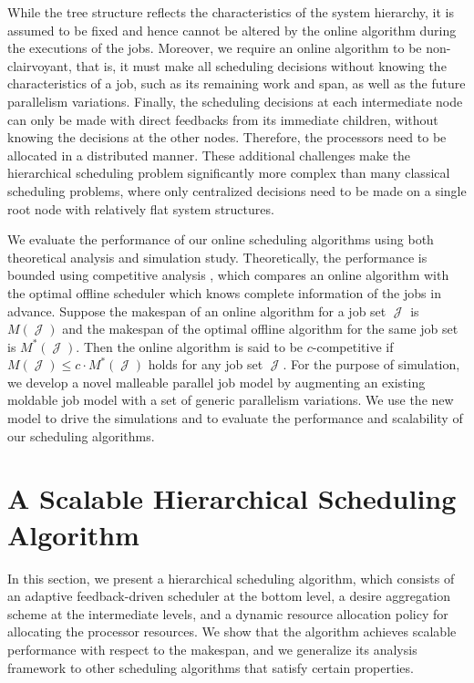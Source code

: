 \documentclass[10pt, a4paper]{article}
\newcommand{\calset}[1]{\ensuremath{\mathop{\mathcal{#1}}\nolimits}}
\newcommand{\jobset}{\calset{J}}
\begin{document}
While the tree structure reflects the characteristics of the system hierarchy, it is assumed to be
fixed and hence cannot be altered by the online algorithm during the executions of the jobs.
Moreover, we require an online algorithm to be non-clairvoyant, that is, it must make all
scheduling decisions without knowing the characteristics of a job, such as its remaining work and
span, as well as the future parallelism variations. Finally, the scheduling decisions at each
intermediate node can only be made with direct feedbacks from its immediate children, without
knowing the decisions at the other nodes. Therefore, the processors need to be allocated in a
distributed manner. These additional challenges make the hierarchical scheduling problem
significantly more complex than many classical scheduling problems, where only centralized
decisions need to be made on a single root node with relatively flat system structures.

We evaluate the performance of our online scheduling algorithms using both theoretical analysis and
simulation study. Theoretically, the performance is bounded using competitive analysis
\cite{BorodinEl98}, which compares an online algorithm with the optimal offline scheduler which
knows complete information of the jobs in advance. Suppose the makespan of an online algorithm for
a job set $\jobset$ is $M(\jobset)$ and the makespan of the optimal offline algorithm for the same
job set is $M^*(\jobset)$. Then the online algorithm is said to be $c$-competitive if $M(\jobset)
\le c \cdot M^*(\jobset)$ holds for any job set $\jobset$. For the purpose of simulation, we
develop a novel malleable parallel job model by augmenting an existing moldable job model
\cite{Downey98} with a set of generic parallelism variations. We use the new model to drive the
simulations and to evaluate the performance and scalability of our scheduling algorithms.

\section{A Scalable Hierarchical Scheduling Algorithm}

In this section, we present a hierarchical scheduling algorithm, which consists of an adaptive
feedback-driven scheduler at the bottom level, a desire aggregation scheme at the intermediate
levels, and a dynamic resource allocation policy for allocating the processor resources. We show
that the algorithm achieves scalable performance with respect to the makespan, and we generalize
its analysis framework to other scheduling algorithms that satisfy certain properties.
\end{document}
